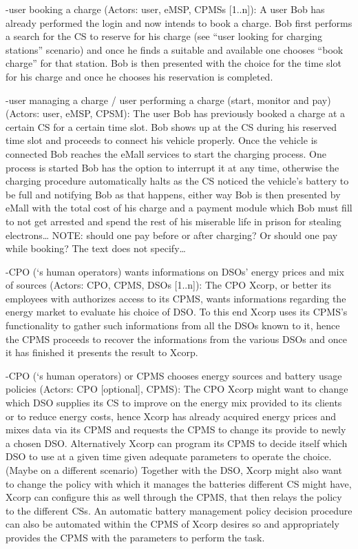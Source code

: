 \documentclass[12pt]{article}
\begin{document}
-user booking a charge (Actors: user, eMSP, CPMSs [1..n]):
A user Bob has already performed the login and now intends to book a charge. Bob first performs a search for the CS to reserve for his charge (see “user looking for charging stations” scenario) and once he finds a suitable and available one chooses “book charge” for that station. Bob is then presented with the choice for the time slot for his charge and once he chooses his reservation is completed.

-user managing a charge / user performing a charge (start, monitor and pay) (Actors: user, eMSP, CPSM):
The user Bob has previously booked a charge at a certain CS for a certain time slot. Bob shows up at the CS during his reserved time slot and proceeds to connect his vehicle properly. Once the vehicle is connected Bob reaches the eMall services to start the charging process. One process is started Bob has the option to interrupt it at any time, otherwise the charging procedure automatically halts as the CS noticed the vehicle’s battery to be full and notifying Bob as that happens, either way Bob is then presented by eMall with the total cost of his charge and a payment module which Bob must fill to not get arrested and spend the rest of his miserable life in prison for stealing electrons…
NOTE: should one pay before or after charging? Or should one pay while booking? The text does not specify…

-CPO (‘s human operators) wants informations on DSOs’ energy prices and mix of sources (Actors: CPO, CPMS, DSOs [1..n]):
The CPO Xcorp, or better its employees with authorizes access to its CPMS, wants informations regarding the energy market to evaluate his choice of DSO. To this end Xcorp uses its CPMS’s functionality to gather such informations from all the DSOs known to it, hence the CPMS proceeds to recover the informations from the various DSOs and once it has finished it presents the result to Xcorp.

-CPO (‘s human operators) or CPMS chooses energy sources and battery usage policies (Actors: CPO [optional], CPMS):
The CPO Xcorp might want to change which DSO supplies its CS to improve on the energy mix provided to its clients or to reduce energy costs, hence Xcorp has already acquired energy prices and mixes data via its CPMS and requests the CPMS to change its provide to newly a chosen DSO.
Alternatively Xcorp can program its CPMS to decide itself which DSO to use at a given time given adequate parameters to operate the choice.
(Maybe on a different scenario)
Together with the DSO, Xcorp might also want to change the policy with which it manages the batteries different CS might have, Xcorp can configure this as well through the CPMS, that then relays the policy to the different CSs. An automatic battery management policy decision procedure can also be automated within the CPMS of Xcorp desires so and appropriately provides the CPMS with the parameters to perform the task.
\end{document}
